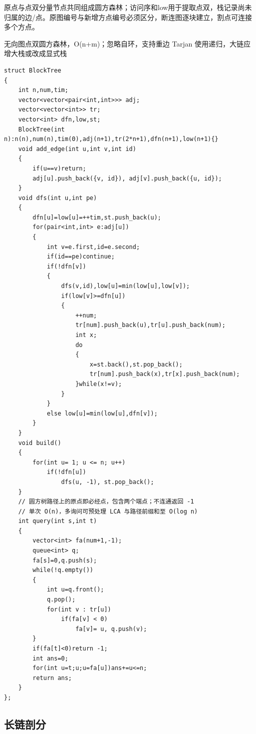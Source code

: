 \documentclass[UTF8,fontset=fandol,a4paper,twoside]{ctexart}
\newcommand{\note}[1]{{\fontsize{10}{12}\selectfont #1\par}}
\begin{document}
\begin{multicols}{2}
\note{原点与点双分量节点共同组成圆方森林；访问序和low用于提取点双，栈记录尚未归属的边/\allowbreak{}点。原图编号与新增方点编号必须区分，断连图逐块建立，割点可连接多个方点。}
\note{无向图点双圆方森林，O(\allowbreak{}n+\allowbreak{}m)\allowbreak{}；忽略自环，支持重边 Tarjan 使用递归，大链应增大栈或改成显式栈}
\begin{lstlisting}
struct BlockTree
{
    int n,num,tim;
    vector<vector<pair<int,int>>> adj;
    vector<vector<int>> tr;
    vector<int> dfn,low,st;
    BlockTree(int n):n(n),num(n),tim(0),adj(n+1),tr(2*n+1),dfn(n+1),low(n+1){}
    void add_edge(int u,int v,int id)
    {
        if(u==v)return;
        adj[u].push_back({v, id}), adj[v].push_back({u, id});
    }
    void dfs(int u,int pe)
    {
        dfn[u]=low[u]=++tim,st.push_back(u);
        for(pair<int,int> e:adj[u])
        {
            int v=e.first,id=e.second;
            if(id==pe)continue;
            if(!dfn[v])
            {
                dfs(v,id),low[u]=min(low[u],low[v]);
                if(low[v]>=dfn[u])
                {
                    ++num;
                    tr[num].push_back(u),tr[u].push_back(num);
                    int x;
                    do
                    {
                        x=st.back(),st.pop_back();
                        tr[num].push_back(x),tr[x].push_back(num);
                    }while(x!=v);
                }
            }
            else low[u]=min(low[u],dfn[v]);
        }
    }
    void build()
    {
        for(int u= 1; u <= n; u++)
            if(!dfn[u])
                dfs(u, -1), st.pop_back();
    }
    // 圆方树路径上的原点即必经点，包含两个端点；不连通返回 -1
    // 单次 O(n)，多询问可预处理 LCA 与路径前缀和至 O(log n)
    int query(int s,int t)
    {
        vector<int> fa(num+1,-1);
        queue<int> q;
        fa[s]=0,q.push(s);
        while(!q.empty())
        {
            int u=q.front();
            q.pop();
            for(int v : tr[u])
                if(fa[v] < 0)
                    fa[v]= u, q.push(v);
        }
        if(fa[t]<0)return -1;
        int ans=0;
        for(int u=t;u;u=fa[u])ans+=u<=n;
        return ans;
    }
};
\end{lstlisting}
\subsection{长链剖分}


\end{multicols}
\end{document}
